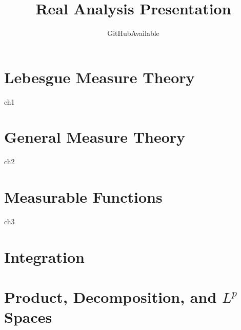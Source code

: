 \documentclass[openany]{book}
\title{Real Analysis Presentation}
\author{GitHubAvailable}
\begin{document}

\frontmatter  %

{
    \hypersetup{linkcolor=blue}
    \tableofcontents
}

\mainmatter  %

\chapter{Lebesgue Measure Theory}
{ch1}

\chapter{General Measure Theory}
{ch2}

\chapter{Measurable Functions}
{ch3}

\chapter{Integration}

\chapter{Product, Decomposition, and $L^p$ Spaces}
\end{document}
